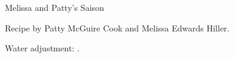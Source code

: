 \begin{recipe}{Melissa and Patty's Saison}

\begin{aboutblock}
Recipe by Patty McGuire Cook and Melissa Edwards Hiller.
\end{aboutblock}


\begin{methodandtiming}

\begin{mashsteps}
\end{mashsteps}

\begin{fermentationsteps}
\end{fermentationsteps}

\begin{directions}
Water adjustment: .
\end{directions}

\end{methodandtiming}

\recipebreak

\begin{ingredientsblock}

\begin{malts}
\end{malts}

\begin{hops}
\end{hops}


\end{ingredientsblock}

\end{recipe}

